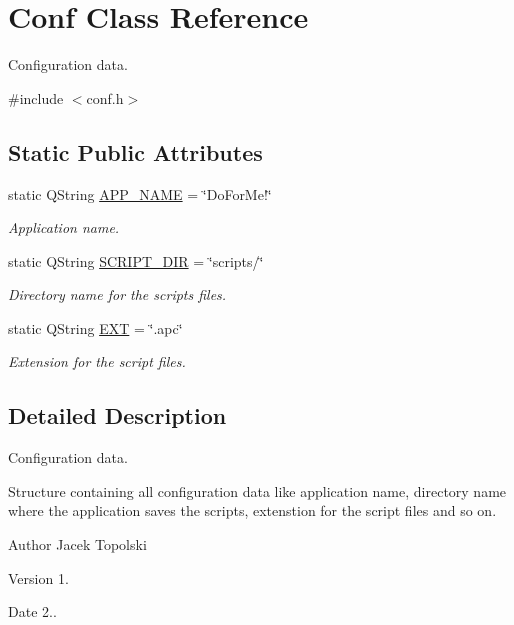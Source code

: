 \hypertarget{struct_conf}{\section{Conf Class Reference}
\label{struct_conf}
}


Configuration data.  




{\ttfamily \#include $<$conf.\-h$>$}

\subsection*{Static Public Attributes}
\begin{DoxyCompactItemize}
\item 
static Q\-String \hyperlink{struct_conf_add8ab284bf2e7a0b2667cfa921d23dad}{A\-P\-P\-\_\-\-N\-A\-M\-E} = \char`\"{}Do\-For\-Me!\char`\"{}
\begin{DoxyCompactList}\small\item\em Application name. \end{DoxyCompactList}\item 
static Q\-String \hyperlink{struct_conf_a612762032000af6687da2f749cb24a5a}{S\-C\-R\-I\-P\-T\-\_\-\-D\-I\-R} = \char`\"{}scripts/\char`\"{}
\begin{DoxyCompactList}\small\item\em Directory name for the scripts files. \end{DoxyCompactList}\item 
static Q\-String \hyperlink{struct_conf_ab3739fc216b9a13237a8e5876ff54c90}{E\-X\-T} = \char`\"{}.apc\char`\"{}
\begin{DoxyCompactList}\small\item\em Extension for the script files. \end{DoxyCompactList}\end{DoxyCompactItemize}


\subsection{Detailed Description}
Configuration data. 

Structure containing all configuration data like application name, directory name where the application saves the scripts, extenstion for the script files and so on. \begin{DoxyAuthor}{Author}
Jacek Topolski 
\end{DoxyAuthor}
\begin{DoxyVersion}{Version}
1. 
\end{DoxyVersion}
\begin{DoxyDate}{Date}
2.. 
\end{DoxyDate}


